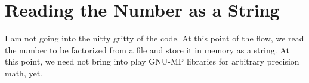 \section{Reading the Number as a String}

I am not going into the nitty gritty of the code. At this point of the flow, we read the number to be factorized from a file and store it in memory as a string. At this point, we need not bring into play GNU-MP libraries for arbitrary precision math, yet. 
